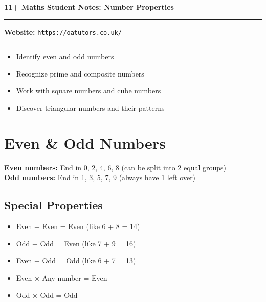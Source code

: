 \documentclass[a4paper,11pt]{article}
\begin{document}
\onehalfspacing


\begin{center}
\textbf{\Large 11+ Maths Student Notes: Number Properties}
\vspace{0.2cm}
\end{center}

\hrule
\vspace{0.1cm}

\textbf{Website:} \texttt{https://oatutors.co.uk/}

\vspace{0.2cm}
\hrule
\vspace{0.3cm}

\begin{tcolorbox}[colback=blue!5!white,colframe=blue!75!black,title=\textbf{What You'll Learn Today}]
\begin{itemize}
    \item Identify even and odd numbers
    \item Recognize prime and composite numbers
    \item Work with square numbers and cube numbers  
    \item Discover triangular numbers and their patterns
\end{itemize}
\end{tcolorbox}

\section{Even \& Odd Numbers}

\begin{tcolorbox}[colback=green!5!white,colframe=green!75!black,title=\textbf{Easy Rules}]
\textbf{Even numbers:} End in 0, 2, 4, 6, 8 (can be split into 2 equal groups)
\\
\textbf{Odd numbers:} End in 1, 3, 5, 7, 9 (always have 1 left over)
\end{tcolorbox}

\subsection{Special Properties}
\begin{itemize}
    \item Even + Even = Even (like 6 + 8 = 14)
    \item Odd + Odd = Even (like 7 + 9 = 16)  
    \item Even + Odd = Odd (like 6 + 7 = 13)
    \item Even × Any number = Even
    \item Odd × Odd = Odd
\end{itemize}
\end{document}
